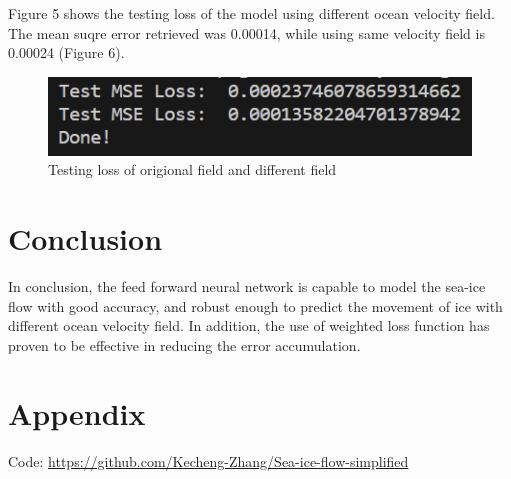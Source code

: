 \documentclass[12pt, a4paper]{article}
\begin{document}
Figure 5 shows the testing loss of the model using different ocean velocity field. The mean suqre error retrieved was 0.00014, while using same velocity field is 0.00024 (Figure 6).

\begin{figure}
    \centering
    \includegraphics[scale=1]{../mse2.png}
    \caption[]{Testing loss of origional field and different field}
    \label{fig:mse2}
\end{figure}

\section{Conclusion}
In conclusion, the feed forward neural network is capable to model the sea-ice flow with good accuracy, and robust enough to predict the movement of ice with different ocean velocity field. In addition, the use of weighted loss function has proven to be effective in reducing the error accumulation.

\newpage
\section{Appendix}
Code: 
\href{https://github.com/Kecheng-Zhang/Sea-ice-flow-simplified}{https://github.com/Kecheng-Zhang/Sea-ice-flow-simplified}
\end{document}

